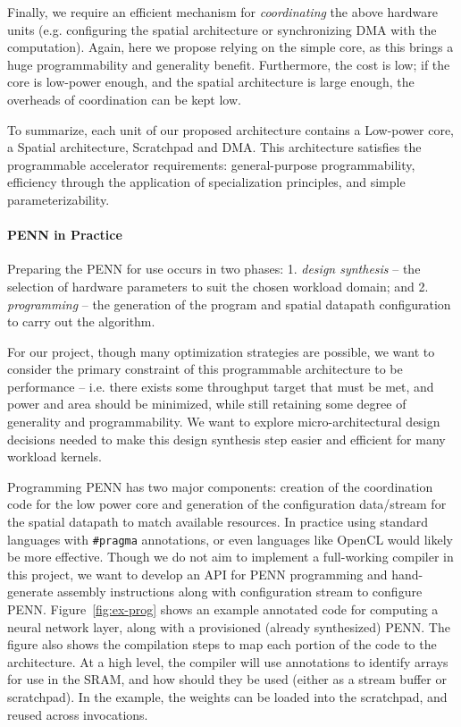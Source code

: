 Finally, we require an efficient mechanism for \emph{coordinating} the above
hardware units (e.g. configuring the spatial architecture or
synchronizing DMA with the computation).  Again, here we propose relying on the
simple core, as this brings a huge programmability and generality benefit.
Furthermore, the cost is low; if the core is low-power enough, and the spatial 
architecture is large enough, the overheads of coordination can be kept low.

To summarize, each unit of our proposed architecture contains a Low-power core,
a Spatial architecture, Scratchpad and DMA.
This architecture satisfies the programmable accelerator requirements:
general-purpose programmability, efficiency through the application of
specialization principles, and simple parameterizability.


\paragraph{PENN in Practice}

Preparing the PENN for use occurs in two phases: 
1. \emph{design synthesis} -- the selection of hardware parameters to suit the chosen workload
domain; and 2. \emph{programming} -- the generation of the program and spatial
datapath configuration to carry out the algorithm.

For our project, though many optimization strategies are possible, 
we  want to consider the 
primary constraint of this programmable architecture to be performance -- i.e. there
exists some throughput target that must be met, and power and area should be
minimized, while still retaining some degree of generality and programmability. 
We want to explore micro-architectural design decisions needed to make this
design synthesis step easier and efficient for many workload kernels.

Programming PENN has two major components: creation of the coordination
code for the low power core and generation of the configuration data/stream for the
spatial datapath to match available resources.  
In practice using standard languages with
\texttt{\#pragma} annotations, or even languages like OpenCL would likely be more
effective.  
Though we do not aim to implement a full-working compiler in this project,
we want to develop an API for PENN programming and hand-generate assembly instructions
along with configuration stream to configure PENN.
Figure~\ref{fig:ex-prog} shows an example annotated code for computing 
a neural network layer, along with a provisioned (already synthesized) PENN.  
The figure also shows the compilation steps to map each portion of the code to the 
architecture.  At a high level, the compiler will use annotations to identify
arrays for use in the SRAM, and how should they be used (either as a stream buffer or scratchpad). 
In the example, the weights can be loaded into the scratchpad, and reused across
invocations.
 
